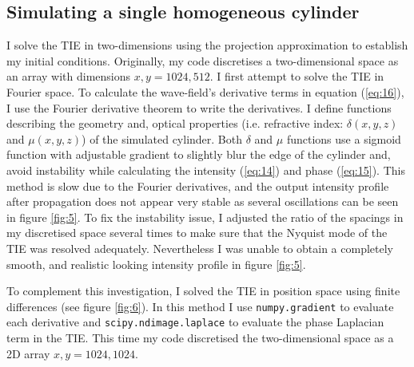 \documentclass[10pt, a4paper, singlespacing]{report}
\begin{document}
\subsection{Simulating a single homogeneous cylinder}\label{Single cylinder}
I solve the TIE in two-dimensions using the projection approximation to establish my initial conditions.  Originally, my code discretises a two-dimensional space as an array with dimensions $x, y = 1024, 512$. I first attempt to solve the TIE in Fourier space. To calculate the wave-field's derivative terms in equation (\ref{eq:16}), I use the Fourier derivative theorem to write the derivatives. I define functions describing the geometry and, optical properties (i.e. refractive index: $\delta(x, y, z)$ and $\mu(x, y, z)$) of the simulated cylinder. Both $\delta$ and $\mu$ functions use a sigmoid function with adjustable gradient to slightly blur the edge of the cylinder and, avoid instability while calculating the intensity (\ref{eq:14}) and phase (\ref{eq:15}). This method is slow due to the Fourier derivatives, and the output intensity profile after propagation does not appear very stable as several oscillations can be seen in figure \ref{fig:5}. To fix the instability issue, I adjusted the ratio of the spacings in my discretised space several times to make sure that the Nyquist mode of the TIE was resolved adequately. Nevertheless I was unable to obtain a completely smooth, and realistic looking intensity profile in figure \ref{fig:5}.

To complement this investigation, I solved the TIE in position space using finite differences (see figure \ref{fig:6}). In this method I use \texttt{numpy.gradient} to evaluate each derivative and \texttt{scipy.ndimage.laplace} to evaluate the phase Laplacian term in the TIE. This time my code discretised the two-dimensional space as a 2D array $x, y = 1024, 1024$. 

\end{document}
